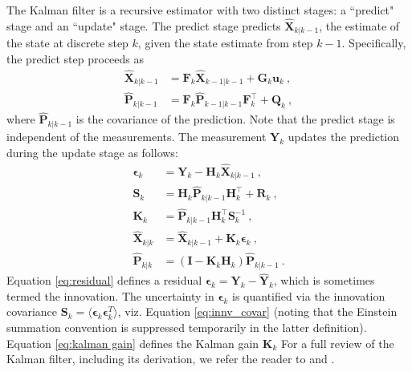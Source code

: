 \documentclass[fleqn,usenatbib,useAMS]{mnras}
\begin{document}
The Kalman filter is a recursive estimator with two distinct stages: a ``predict" stage and an ``update" stage. The predict stage predicts $\hat{\boldsymbol{X}}_{k|k-1}$, the estimate of the state at discrete step $k$, given the state estimate from step $k-1$. Specifically, the predict step proceeds as
\begin{align}
	\hat{\boldsymbol{X}}_{k|k-1} &=  \boldsymbol{F}_k \hat{\boldsymbol{X}}_{k-1|k-1} + \boldsymbol{G}_k \boldsymbol{u}_k \ , \\
	\hat{\boldsymbol{P}}_{k|k-1} &=  \boldsymbol{F}_k \hat{\boldsymbol{P}}_{k-1|k-1} \boldsymbol{F}_k^\intercal + \boldsymbol{Q}_k  \ ,
\end{align}
where $\hat{\boldsymbol{P}}_{k|k-1}$ is the covariance of the prediction. Note that the predict stage is independent of the measurements. The measurement $\boldsymbol{Y}_k$ updates the prediction during the update stage as follows:
\begin{align}
	\boldsymbol{\epsilon}_{k} &= \boldsymbol{Y}_k - \boldsymbol{H}_k \hat{\boldsymbol{X}}_{k|k-1} \ , \label{eq:residual} \\
	\boldsymbol{S}_k &= \boldsymbol{H}_k \hat{\boldsymbol{P}}_{k|k-1} \boldsymbol{H}_k^\intercal + \boldsymbol{R}_k \ , \label{eq:innv_covar}\\
	\boldsymbol{K}_k &= \hat{\boldsymbol{P}}_{k|k-1} \boldsymbol{H}_k^\intercal \boldsymbol{S}_k^{-1} \ ,\label{eq:kalman gain} \\
	\hat{\boldsymbol{X}}_{k|k} &=\hat{\boldsymbol{X}}_{k|k-1} +\boldsymbol{K}_k  \boldsymbol{\epsilon}_{k}  \ , \label{eq:kalmangainupdate} \\
	\hat{\boldsymbol{P}}_{k|k} &= \left( \boldsymbol{I} - \boldsymbol{K}_k \boldsymbol{H}_k \right) 	\hat{\boldsymbol{P}}_{k|k-1} \ .
\end{align}
Equation \eqref{eq:residual} defines a residual $\boldsymbol{\epsilon}_k = \boldsymbol{Y}_k  - \hat{\boldsymbol{Y}}_k$, which is sometimes termed the innovation. The uncertainty in $\boldsymbol{\epsilon}_k$ is quantified via the innovation covariance $\boldsymbol{S}_k = \langle \boldsymbol{\epsilon}_k \boldsymbol{\epsilon}_k^{T} \rangle$, viz. Equation \eqref{eq:innv_covar} (noting that the Einstein summation convention is suppressed temporarily in the latter definition). Equation \eqref{eq:kalman gain} defines the Kalman gain $\boldsymbol{K}_k$ For a full review of the Kalman filter, including its derivation, we refer the reader to \cite{Gelb:1974} and \cite{zarchan2000fundamentals}. \newline 
\end{document}
